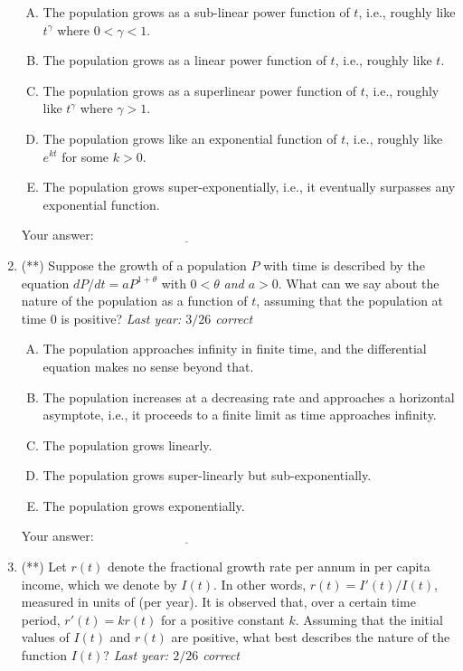 \documentclass[10pt]{amsart}
\begin{document}
\begin{enumerate}
  \begin{enumerate}[(A)]
  \item The population grows as a sub-linear power function of $t$,
    i.e., roughly like $t^\gamma$ where $0 < \gamma < 1$.
  \item The population grows as a linear power function of $t$, i.e.,
    roughly like $t$.
  \item The population grows as a superlinear power function of $t$,
    i.e., roughly like $t^\gamma$ where $\gamma > 1$.
  \item The population grows like an exponential function of $t$,
    i.e., roughly like $e^{kt}$ for some $k > 0$.
  \item The population grows super-exponentially, i.e., it eventually
  surpasses any exponential function.
  \end{enumerate}

  \vspace{0.1in}
  Your answer: $\underline{\qquad\qquad\qquad\qquad\qquad\qquad\qquad}$
  \vspace{0.15in}

\item (**) Suppose the growth of a population $P$ with time is described by
  the equation $dP/dt = aP^{1 + \theta}$ with $0 < \theta$ {\em and $a
  > 0$}. What can we say about the nature of the population as a
  function of $t$, assuming that the population at time $0$ is
  positive? {\em Last year: $3/26$ correct}

  \begin{enumerate}[(A)]
  \item The population approaches infinity in finite time, and the
    differential equation makes no sense beyond that.
  \item The population increases at a decreasing rate and approaches a
    horizontal asymptote, i.e., it proceeds to a finite limit as time
    approaches infinity.
  \item The population grows linearly.
  \item The population grows super-linearly but sub-exponentially.
  \item The population grows exponentially.
  \end{enumerate}

  \vspace{0.1in}
  Your answer: $\underline{\qquad\qquad\qquad\qquad\qquad\qquad\qquad}$
  \vspace{0.15in}


\item (**) Let $r(t)$ denote the fractional growth rate per annum in
  per capita income, which we denote by $I(t)$. In other words, $r(t)
  = I'(t)/I(t)$, measured in units of (per year). It is observed that,
  over a certain time period, $r'(t) = kr(t)$ for a positive constant
  $k$. Assuming that the initial values of $I(t)$ and $r(t)$ are
  positive, what best describes the nature of the function $I(t)$?
  {\em Last year: $2/26$ correct}


\end{enumerate}
\end{document}

